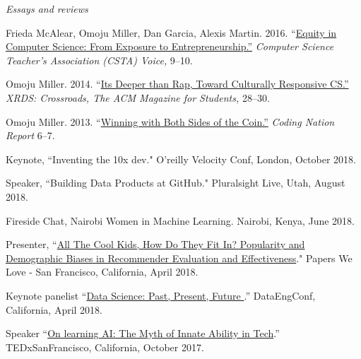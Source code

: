 \documentclass[11pt,article,oneside]{memoir}
\begin{document}
\bigskip
\noindent\emph{Essays and reviews \vspace{0.05in}}



\ind Frieda McAlear, Omoju Miller, Dan Garcia, Alexis Martin. 2016. ``\href{http://www.csta.acm.org/Communications/sub/CSTAVoice_Files/csta_voice_01_2016.pdf}{Equity in Computer Science: From Exposure to Entrepreneurship.''} \emph{Computer Science Teacher's Association (CSTA) Voice, } 9--10.

\ind Omoju Miller. 2014. ``\href{http://dl.acm.org/citation.cfm?id=2604994}{Its Deeper than Rap, Toward Culturally Responsive CS.'' }\emph{XRDS: Crossroads,  The ACM Magazine for Students, } 28--30.

\ind Omoju Miller. 2013. ``\href{http://kaporcenter.org/wp-content/uploads/2013/10/Kapor_CodingLandscape_R3.pdf}{Winning with Both Sides of the Coin.''} \emph{Coding Nation Report} 6--7.

 \bigskip


\medskip

\ind Keynote, ``Inventing the 10x dev." O'reilly Velocity Conf, London, October 2018.

\ind Speaker, ``Building Data Products at GitHub." Pluralsight Live, Utah, August 2018.

\ind Fireside Chat, Nairobi Women in Machine Learning. Nairobi, Kenya, June 2018.

\ind Presenter, ``\href{http://proceedings.mlr.press/v81/ekstrand18b/ekstrand18b.pdf}{All The Cool Kids, How Do They Fit In? Popularity and Demographic Biases in Recommender Evaluation and Effectiveness}." Papers We Love - San Francisco, California, April 2018. 

\ind Keynote panelist ``\href{https://youtu.be/_F534KBWFJc}{Data Science: Past, Present, Future }.'' DataEngConf, California, April 2018.

\ind Speaker ``\href{https://youtu.be/BFWVHSeakkg}{On learning AI: The Myth of Innate Ability in Tech}.'' TEDxSanFrancisco, California, October 2017.
\end{document}
